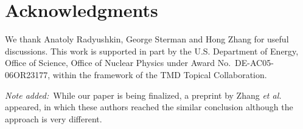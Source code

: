\section*{Acknowledgments}
\label{sec:acknowledgments}

We thank Anatoly Radyushkin, George Sterman and Hong Zhang for useful discussions.
This work is supported in part by the U.S. Department of Energy, Office of Science, Office of Nuclear Physics under Award No.~DE-AC05-06OR23177, within the framework of the TMD Topical Collaboration.

{\it Note added:}\ While our paper is being finalized, a preprint by Zhang {\it et al.} \cite{Zhang:2018diq} appeared, in which these authors reached the similar conclusion  although the approach is very different.


